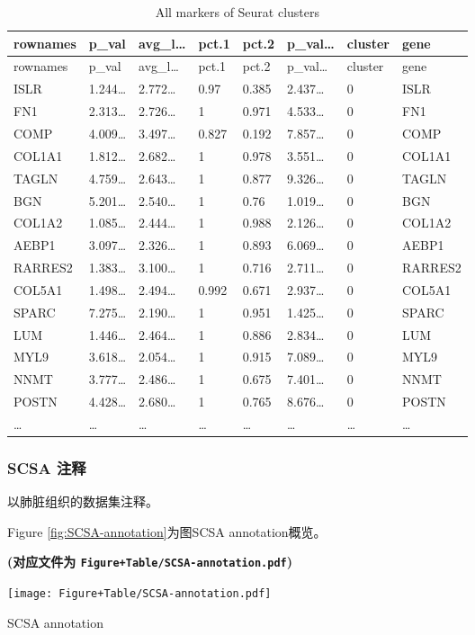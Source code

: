 \documentclass[
]{article}
\begin{document}
\begin{longtable}[]{@{}llllllll@{}}
\caption{\label{tab:all-markers-of-Seurat-clusters}All markers of Seurat clusters}\tabularnewline
\toprule
rownames & p\_val & avg\_l\ldots{} & pct.1 & pct.2 & p\_val\ldots{} & cluster & gene\tabularnewline
\midrule
\endfirsthead
\toprule
rownames & p\_val & avg\_l\ldots{} & pct.1 & pct.2 & p\_val\ldots{} & cluster & gene\tabularnewline
\midrule
\endhead
ISLR & 1.244\ldots{} & 2.772\ldots{} & 0.97 & 0.385 & 2.437\ldots{} & 0 & ISLR\tabularnewline
FN1 & 2.313\ldots{} & 2.726\ldots{} & 1 & 0.971 & 4.533\ldots{} & 0 & FN1\tabularnewline
COMP & 4.009\ldots{} & 3.497\ldots{} & 0.827 & 0.192 & 7.857\ldots{} & 0 & COMP\tabularnewline
COL1A1 & 1.812\ldots{} & 2.682\ldots{} & 1 & 0.978 & 3.551\ldots{} & 0 & COL1A1\tabularnewline
TAGLN & 4.759\ldots{} & 2.643\ldots{} & 1 & 0.877 & 9.326\ldots{} & 0 & TAGLN\tabularnewline
BGN & 5.201\ldots{} & 2.540\ldots{} & 1 & 0.76 & 1.019\ldots{} & 0 & BGN\tabularnewline
COL1A2 & 1.085\ldots{} & 2.444\ldots{} & 1 & 0.988 & 2.126\ldots{} & 0 & COL1A2\tabularnewline
AEBP1 & 3.097\ldots{} & 2.326\ldots{} & 1 & 0.893 & 6.069\ldots{} & 0 & AEBP1\tabularnewline
RARRES2 & 1.383\ldots{} & 3.100\ldots{} & 1 & 0.716 & 2.711\ldots{} & 0 & RARRES2\tabularnewline
COL5A1 & 1.498\ldots{} & 2.494\ldots{} & 0.992 & 0.671 & 2.937\ldots{} & 0 & COL5A1\tabularnewline
SPARC & 7.275\ldots{} & 2.190\ldots{} & 1 & 0.951 & 1.425\ldots{} & 0 & SPARC\tabularnewline
LUM & 1.446\ldots{} & 2.464\ldots{} & 1 & 0.886 & 2.834\ldots{} & 0 & LUM\tabularnewline
MYL9 & 3.618\ldots{} & 2.054\ldots{} & 1 & 0.915 & 7.089\ldots{} & 0 & MYL9\tabularnewline
NNMT & 3.777\ldots{} & 2.486\ldots{} & 1 & 0.675 & 7.401\ldots{} & 0 & NNMT\tabularnewline
POSTN & 4.428\ldots{} & 2.680\ldots{} & 1 & 0.765 & 8.676\ldots{} & 0 & POSTN\tabularnewline
\ldots{} & \ldots{} & \ldots{} & \ldots{} & \ldots{} & \ldots{} & \ldots{} & \ldots{}\tabularnewline
\bottomrule
\end{longtable}

\hypertarget{scsa-ux6ce8ux91ca}{%
\subsubsection{SCSA 注释}\label{scsa-ux6ce8ux91ca}}

以肺脏组织的数据集注释。

Figure \ref{fig:SCSA-annotation}为图SCSA annotation概览。

\textbf{(对应文件为 \texttt{Figure+Table/SCSA-annotation.pdf})}

\def\@captype{figure}
\begin{center}
\texttt{[image: Figure+Table/SCSA-annotation.pdf]}
\caption{SCSA annotation}\label{fig:SCSA-annotation}
\end{center}
\end{document}
